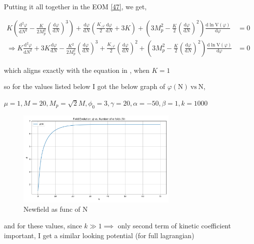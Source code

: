 \documentclass{article}
\begin{document}
Putting it all together in the EOM \ref{47}, we get, 

\begin{align}
    K \left( \frac{\text{d}^2\varphi}{\text{d}N^2} - \frac{K}{2M_p^2} \left(\frac{\text{d}\varphi}{\text{d}N} \right)^3 \right) +  \frac{\text{d}\varphi}{\text{d}N} \left(\frac{K_{,\varphi}}{2} \frac{\text{d}\varphi}{\text{d}N}+ 3 K \right) + \left( 3 M_p^2 - \frac{K}{2} \left(\frac{\text{d}\varphi}{\text{d}N} \right)^2 \right) \frac{\text{d}\ln \text{V}(\varphi)}{\text{d} \varphi} &= 0 \nonumber \\
    \Rightarrow K\frac{\text{d}^2\varphi}{\text{d}N^2} +3 K \frac{\text{d}\varphi}{\text{d}N}  - \frac{K^2}{2M_p^2} \left(\frac{\text{d}\varphi}{\text{d}N} \right)^3  +  \frac{K_{,\varphi}}{2}  \left(\frac{\text{d}\varphi}{\text{d}N} \right)^2 +  \left( 3 M_p^2 - \frac{K}{2} \left(\frac{\text{d}\varphi}{\text{d}N} \right)^2 \right) \frac{\text{d}\ln \text{V}(\varphi)}{\text{d} \varphi} &= 0    
\end{align}

which aligns exactly with the equation in \cite{barker2024inflationarygravitationalwavesignatures}, when $K = 1$

so for the values listed below I got the below graph of $\varphi(\text{N}) \: \text{vs} \: \text{N}$,

$\mu = 1, M = 20  ,M_p = \sqrt2 M ,\phi_0 = 3, \gamma = 20 ,\alpha = -50 ,\beta = 1 ,k = 1000$

\begin{figure}[h!]
    \centering
    \includegraphics[width=0.7\textwidth]{Python/Figures/New Field as a function of N.png}
    \caption{Newfield as func of N}
    \label{Newfield as func of N}
\end{figure}

and for these values, since $k \gg 1 \implies$ only second term of kinetic coefficient important, I get a similar looking potential (for full lagrangian) 
\end{document}
